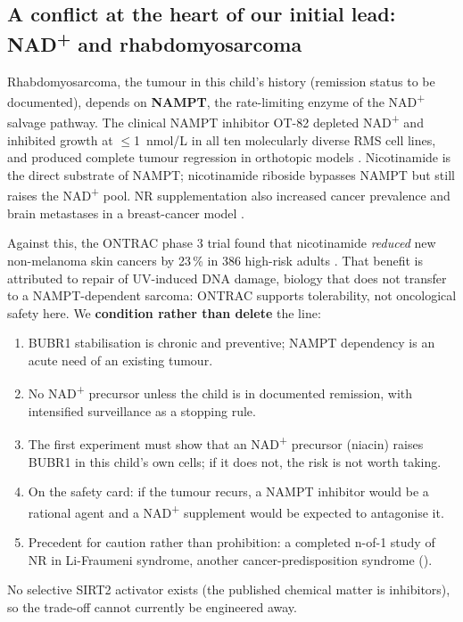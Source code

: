 \documentclass[10pt]{article}
\begin{document}
\subsection{A conflict at the heart of our initial lead: NAD\textsuperscript{+} and rhabdomyosarcoma}
\label{sec:nad}
\begin{cautionbox}[title={What we found}]
Rhabdomyosarcoma, the tumour in this child's history (remission status to be documented), depends on \textbf{NAMPT}, the rate-limiting enzyme of the
NAD\textsuperscript{+} salvage pathway. The clinical NAMPT inhibitor OT-82 depleted NAD\textsuperscript{+} and
inhibited growth at $\leq$1~nmol/L in all ten molecularly diverse RMS cell lines, and produced complete tumour
regression in orthotopic models \citep{mckay}. Nicotinamide is the direct substrate of NAMPT; nicotinamide riboside
bypasses NAMPT but still raises the NAD\textsuperscript{+} pool. NR supplementation also increased cancer prevalence and
brain metastases in a breast-cancer model \citep{maric}.
\end{cautionbox}
Against this, the ONTRAC phase 3 trial found that nicotinamide \textit{reduced} new non-melanoma skin cancers by 23\,\%
in 386 high-risk adults \citep{ontrac}. That benefit is attributed to repair of UV-induced DNA damage, biology that does
not transfer to a NAMPT-dependent sarcoma: ONTRAC supports tolerability, not oncological safety here. We
\textbf{condition rather than delete} the line:
\begin{enumerate}
\item BUBR1 stabilisation is chronic and preventive; NAMPT dependency is an acute need of an existing tumour.
\item No NAD\textsuperscript{+} precursor unless the child is in documented remission, with intensified surveillance
  \citep{nakano} as a stopping rule.
\item The first experiment must show that an NAD\textsuperscript{+} precursor (niacin) raises BUBR1 in this child's own cells; if it does not, the
  risk is not worth taking.
\item On the safety card: if the tumour recurs, a NAMPT inhibitor would be a rational agent and a
  NAD\textsuperscript{+} supplement would be expected to antagonise it.
\item Precedent for caution rather than prohibition: a completed n-of-1 study of NR in Li-Fraumeni syndrome, another
  cancer-predisposition syndrome ().
\end{enumerate}
No selective SIRT2 activator exists (the published chemical matter is inhibitors), so the trade-off cannot currently be
engineered away.
\end{document}
